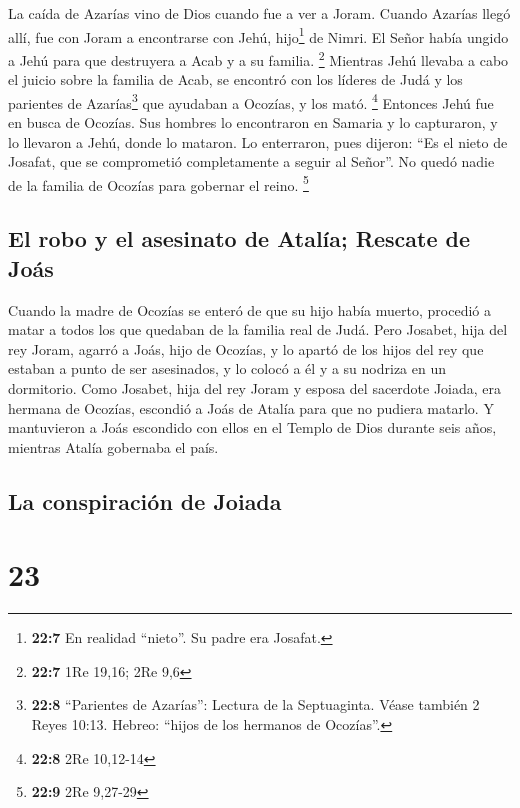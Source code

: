  La caída de Azarías vino de Dios cuando fue a ver a
Joram. Cuando Azarías llegó allí, fue con Joram a encontrarse con Jehú,
hijo\footnote{\textbf{22:7} En realidad ``nieto''. Su padre era Josafat.}
de Nimri. El Señor había ungido a Jehú para que destruyera a Acab y a su
familia. \footnote{\textbf{22:7} 1Re 19,16; 2Re 9,6} 
Mientras Jehú llevaba a cabo el juicio sobre la familia de Acab, se
encontró con los líderes de Judá y los parientes de Azarías\footnote{\textbf{22:8}
  ``Parientes de Azarías'': Lectura de la Septuaginta. Véase también 2
  Reyes 10:13. Hebreo: ``hijos de los hermanos de Ocozías''.} que
ayudaban a Ocozías, y los mató. \footnote{\textbf{22:8} 2Re 10,12-14}
 Entonces Jehú fue en busca de Ocozías. Sus hombres lo
encontraron en Samaria y lo capturaron, y lo llevaron a Jehú, donde lo
mataron. Lo enterraron, pues dijeron: ``Es el nieto de Josafat, que se
comprometió completamente a seguir al Señor''. No quedó nadie de la
familia de Ocozías para gobernar el reino. \footnote{\textbf{22:9} 2Re
  9,27-29}

\hypertarget{el-robo-y-el-asesinato-de-ataluxeda-rescate-de-jouxe1s}{%
\subsection{El robo y el asesinato de Atalía; Rescate de
Joás}\label{el-robo-y-el-asesinato-de-ataluxeda-rescate-de-jouxe1s}}

 Cuando la madre de Ocozías se enteró de que su hijo
había muerto, procedió a matar a todos los que quedaban de la familia
real de Judá.  Pero Josabet, hija del rey Joram, agarró a
Joás, hijo de Ocozías, y lo apartó de los hijos del rey que estaban a
punto de ser asesinados, y lo colocó a él y a su nodriza en un
dormitorio. Como Josabet, hija del rey Joram y esposa del sacerdote
Joiada, era hermana de Ocozías, escondió a Joás de Atalía para que no
pudiera matarlo.  Y mantuvieron a Joás escondido con
ellos en el Templo de Dios durante seis años, mientras Atalía gobernaba
el país.

\hypertarget{la-conspiraciuxf3n-de-joiada}{%
\subsection{La conspiración de
Joiada}\label{la-conspiraciuxf3n-de-joiada}}

\hypertarget{section-22}{%
\section{23}\label{section-22}}

